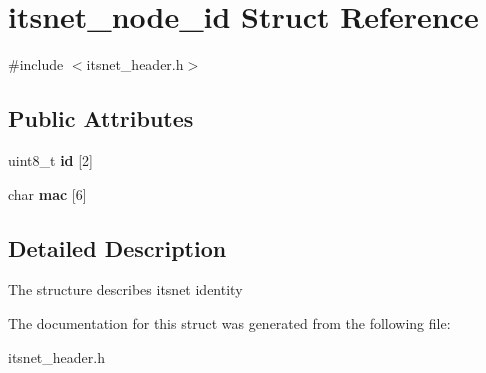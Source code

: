 \hypertarget{structitsnet__node__id}{\section{itsnet\-\_\-node\-\_\-id \-Struct \-Reference}
\label{structitsnet__node__id}
}


{\ttfamily \#include $<$itsnet\-\_\-header.\-h$>$}

\subsection*{\-Public \-Attributes}
\begin{DoxyCompactItemize}
\item 
\hypertarget{structitsnet__node__id_a84626e52e4f0522c27b33cd550635aec}{uint8\-\_\-t {\bfseries id} \mbox{[}2\mbox{]}}\label{structitsnet__node__id_a84626e52e4f0522c27b33cd550635aec}

\item 
\hypertarget{structitsnet__node__id_a8ac7fdc9c4d4973a0b4ad8db1162bfc4}{char {\bfseries mac} \mbox{[}6\mbox{]}}\label{structitsnet__node__id_a8ac7fdc9c4d4973a0b4ad8db1162bfc4}

\end{DoxyCompactItemize}


\subsection{\-Detailed \-Description}
\-The structure describes itsnet identity 

\-The documentation for this struct was generated from the following file\-:\begin{DoxyCompactItemize}
\item 
itsnet\-\_\-header.\-h\end{DoxyCompactItemize}
